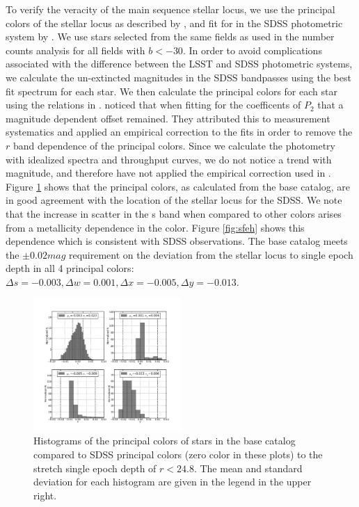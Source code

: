 \documentclass[11pt]{article}
\begin{document}
To verify the veracity of the main sequence stellar locus, we use the
principal colors of the stellar locus as described by \citet{helmi02},
and fit for in the SDSS photometric system by \citet{ivezic04}.  We
use stars selected from the same fields as used in the number counts
analysis for all fields with $b<-30$.  In order to avoid complications
associated with the difference between the LSST and SDSS photometric
systems, we calculate the un-extincted magnitudes in the SDSS
bandpasses using the best fit spectrum for each star.  We then
calculate the principal colors for each star using the relations in
\citet{ivezic04}.  \citet{ivezic04} noticed that when fitting for the
coefficents of $P_{2}$ that a magnitude dependent offset remained.
They attributed this to measurement systematics and applied an
empirical correction to the fits in order to remove the $r$ band
dependence of the principal colors.  Since we calculate the photometry
with idealized spectra and throughput curves, we do not notice a trend
with magnitude, and therefore have not applied the empirical
correction used in \citet{ivezic04}.  Figure
\ref{fig:principalcolorshist} shows that the principal colors, as
calculated from the base catalog, are in good agreement with the
location of the stellar locus for the SDSS.  We note that the increase
in scatter in the s band when compared to other colors arises from a
metallicity dependence in the color.  Figure \ref{fig:sfeh} shows this
dependence which is consistent with SDSS observations. The base
catalog meets the $\pm0.02mag$ requirement on the deviation from the
stellar locus to single epoch depth in all 4 principal colors:
${\Delta}s=-0.003, {\Delta}w=0.001, {\Delta}x=-0.005,
{\Delta}y=-0.013$.

\begin{figure}[h]
\centering
\includegraphics[width=0.5\textwidth]{validation_figures/principal_colors_hist.png}
\caption{Histograms of the principal colors of stars in the base
  catalog compared to SDSS principal colors (zero color in these
  plots) to the stretch single epoch depth of $r < 24.8$. The mean and
  standard deviation for each histogram are given in the legend in the
  upper right.\label{fig:principalcolorshist}}
\end{figure}
\end{document}
